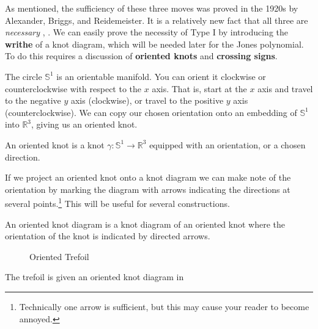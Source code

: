         \par\hfill\par
        As mentioned, the sufficiency of these three moves was proved in the
        1920s by Alexander, Briggs, and Reidemeister. It is a relatively new
        fact that all three are \textit{necessary}
        \cite{OstlundReidemeisterMoves2001},
        \cite{HaggeReidemeisterRequired2005}. We can easily prove the necessity
        of Type I by introducing the \textbf{writhe} of a knot diagram, which
        will be needed later for the Jones polynomial. To do this requires a
        discussion of \textbf{oriented knots} and \textbf{crossing signs}.
        \par\hfill\par
        The circle $\mathbb{S}^{1}$ is an orientable manifold. You can orient it
        clockwise or counterclockwise with respect to the $x$ axis. That is,
        start at the $x$ axis and travel to the negative $y$ axis
        (clockwise), or travel to the positive $y$ axis (counterclockwise).
        We can copy our chosen orientation onto an embedding of
        $\mathbb{S}^{1}$ into $\mathbb{R}^{3}$, giving us an oriented knot.
        \begin{definition}
            An oriented knot is a knot
            $\gamma:\mathbb{S}^{1}\rightarrow\mathbb{R}^{3}$ equipped with an
            orientation, or a chosen direction.
        \end{definition}
        If we project an oriented knot onto a knot diagram we can make note of
        the orientation by marking the diagram with arrows indicating the
        directions at several points.\footnote{%
            Technically one arrow is sufficient, but this may cause your
            reader to become annoyed.
        }
        This will be useful for several constructions.
        \begin{definition}
            An oriented knot diagram is a knot diagram of an oriented knot
            where the orientation of the knot is indicated by directed arrows.
        \end{definition}
        \begin{figure}
            \centering
            \caption{Oriented Trefoil}
            \label{fig:trefoil_knot_oriented_001}
        \end{figure}
        The trefoil is given an oriented knot diagram in
